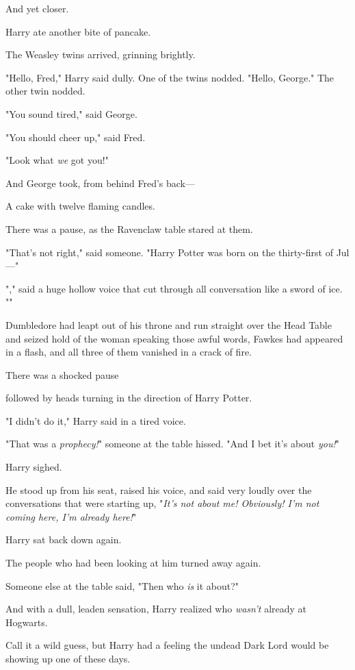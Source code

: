 And yet closer.

Harry ate another bite of pancake.

The Weasley twins arrived, grinning brightly.

"Hello, Fred," Harry said dully. One of the twins nodded. "Hello, George." The
other twin nodded.

"You sound tired," said George.

"You should cheer up," said Fred.

"Look what \emph{we} got you!"

And George took, from behind Fred's back—

A cake with twelve flaming candles.

There was a pause, as the Ravenclaw table stared at them.

"That's not right," said someone. "Harry Potter was born on the thirty-first of
Jul—"

"," said a huge hollow voice that cut through all
conversation like a sword of ice. ""

Dumbledore had leapt out of his throne and run straight over the Head Table and
seized hold of the woman speaking those awful words, Fawkes had appeared in a
flash, and all three of them vanished in a crack of fire.

There was a shocked pause{\el}

{\el} followed by heads turning in the direction of Harry Potter.

"I didn't do it," Harry said in a tired voice.

"That was a \emph{prophecy!}" someone at the table hissed. "And I bet it's
about \emph{you!}"

Harry sighed.

He stood up from his seat, raised his voice, and said very loudly over the
conversations that were starting up, "\emph{It's not about me! Obviously! I'm
not coming here, I'm already here!}"

Harry sat back down again.

The people who had been looking at him turned away again.

Someone else at the table said, "Then who \emph{is} it about?"

And with a dull, leaden sensation, Harry realized who \emph{wasn't} already at
Hogwarts.

Call it a wild guess, but Harry had a feeling the undead Dark Lord would be
showing up one of these days.

